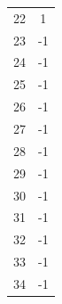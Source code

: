 \documentclass[11pt]{article}
\begin{document}
\begin{enumerate}
\begin{center}
\begin{tabular}{|c|c|}
	22 & 1 \\
	23 & -1 \\
	24 & -1 \\
	25 & -1 \\
	26 & -1 \\
	27 & -1 \\
	28 & -1 \\
	29 & -1 \\
	30 & -1 \\
	31 & -1 \\
	32 & -1 \\
	33 & -1 \\
	34 & -1 \\
	\hline
	\end{tabular}
	\end{center}
\end{enumerate}
\begin{center}
\end{center}
\end{document}
